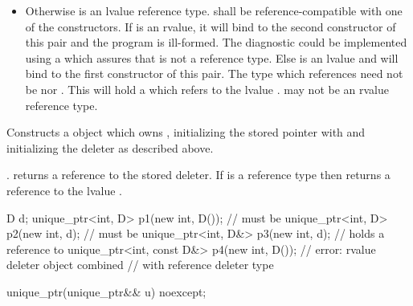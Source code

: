 \begin{itemdescr}
\begin{itemize}
\item Otherwise  is an lvalue reference type. 
shall be reference-compatible with one of the constructors. If  is
an rvalue, it will bind to the second constructor of this pair and the program is
ill-formed. \enternote The diagnostic could
be implemented using a  which assures that
 is not a reference type. \exitnote Else 
is an lvalue and will bind to the first constructor of this pair. The type
which  references need not be 
nor . This  will
hold a  which refers to the lvalue .
\enternote {} may not be an rvalue reference type.
\exitnote
\end{itemize}

\pnum
\effects Constructs a  object which owns , initializing
the stored pointer with  and initializing the deleter as described above.

\pnum
\postconditions {}.
 returns a reference to the stored
deleter. If  is a reference type then 
returns a reference to the lvalue .

\enterexample

\begin{codeblock}
D d;
unique_ptr<int, D> p1(new int, D());        //  must be 
unique_ptr<int, D> p2(new int, d);          //  must be 
unique_ptr<int, D&> p3(new int, d);         //  holds a reference to 
unique_ptr<int, const D&> p4(new int, D()); // error: rvalue deleter object combined
                                            // with reference deleter type
\end{codeblock}

\exitexample

\end{itemdescr}

%
\begin{itemdecl}
unique_ptr(unique_ptr&& u) noexcept;
\end{itemdecl}

